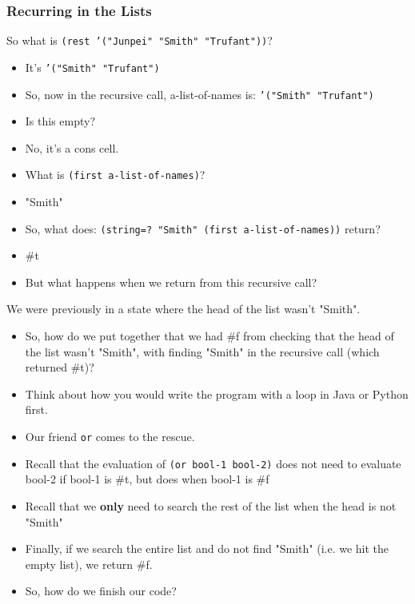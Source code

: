\documentclass{beamer}
\begin{document}
\begin{frame}
  \frametitle{Recurring in the Lists}
  So what is \texttt{(rest '("Junpei" "Smith" "Trufant"))}?
  \begin{itemize}
  \item<2-> It's \texttt{'("Smith" "Trufant")}
  \item<3-> So, now in the recursive call, a-list-of-names is:
    \texttt{'("Smith" "Trufant")}
  \item<4-> Is this empty?
  \item<5-> No, it's a cons cell.
  \item<6-> What is \texttt{(first a-list-of-names)}?
  \item<7-> "Smith"
  \item<8-> So, what does: \texttt{(string=? "Smith" (first a-list-of-names))} return?
  \item<9-> \#t
  \item<10-> But what happens when we return from this recursive call?
  \end{itemize}
\end{frame}

\begin{frame}
  We were previously in a state where the head of the list wasn't "Smith".
  \begin{itemize}
  \item<2-> So, how do we put together that we had \#f from checking
    that the head of the list wasn't "Smith", with finding "Smith" in the recursive call (which returned \#t)?
  \item<3-> Think about how you would write the program
    with a loop in Java or Python first.
  \item<4-> Our friend \texttt{or} comes to the rescue.
  \item<5-> Recall that the evaluation of \texttt{(or bool-1 bool-2)}
    does not need to evaluate bool-2 if bool-1 is \#t, but does when bool-1 is \#f
  \item<6-> Recall that we \textbf{only} need to search the rest of the list
    when the head is not "Smith"
  \item<7-> Finally, if we search the entire list and do not find "Smith" (i.e. we hit the empty list), we return \#f.
  \item<8-> So, how do we finish our code?
  \end{itemize}
\end{frame}
\end{document}
